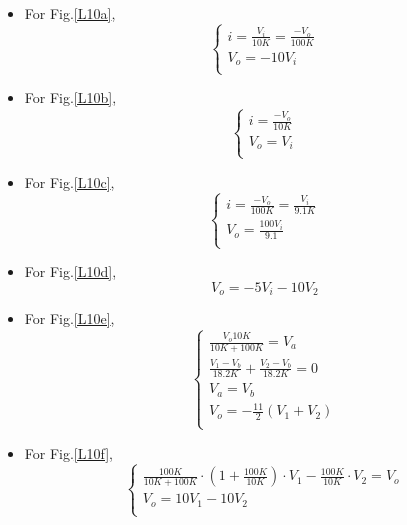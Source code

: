     \begin{itemize}
        \item For Fig.\ref{L10a},
            \begin{equation}
                \begin{cases}
                    i=\frac{V_i}{10K}=\frac{-V_o}{100K}\\
                    V_o=-10V_i\\
                \end{cases}
            \end{equation}
        \item For Fig.\ref{L10b},
            \begin{equation}
                \begin{cases}
                    i=\frac{-V_o}{10K}\\
                    V_o=V_i\\
                \end{cases}
            \end{equation}
        \item For Fig.\ref{L10c},
            \begin{equation}
                \begin{cases}
                    i=\frac{-V_o}{100K}=\frac{V_i}{9.1K}\\
                    V_o=\frac{100V_i}{9.1}\\
                \end{cases}
            \end{equation}
        \item For Fig.\ref{L10d},
            \begin{equation}
                V_o=-5V_i-10V_2
            \end{equation}
        \item For Fig.\ref{L10e},
            \begin{equation}
                \begin{cases}
                    \frac{V_o10K}{10K+100K}=V_a\\
                    \frac{V_1-V_b}{18.2K}+\frac{V_2-V_b}{18.2K}=0\\
                    V_a=V_b\\
                    V_o=-\frac{11}{2}(V_1+V_2)\\
                \end{cases}
            \end{equation}
        \item For Fig.\ref{L10f},
            \begin{equation}
                \begin{cases}
                    \frac{100K}{10K+100K}\cdot(1+\frac{100K}{10K})\cdot V_1-\frac{100K}{10K}\cdot V_2=V_o\\
                    V_o=10V_1-10V_2\\
                \end{cases}
            \end{equation}
    \end{itemize}



